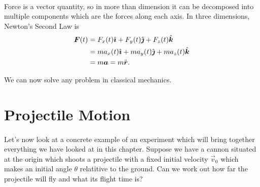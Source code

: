\documentclass[../classical_mechanics.tex]{subfiles}
\begin{document}
        \paragraph{}
        Force is a vector quantity, so in more than dimension it can be decomposed into multiple components which are the forces along each axis.
        In three dimensions, Newton's Second Law is
        \begin{align*}
            \boldsymbol{F}(t)&=F_x(t)\hat{\boldsymbol{\imath}}+F_y(t)\hat{\boldsymbol{\jmath}}+F_z(t)\hat{\boldsymbol{k}}\\
            &=ma_x(t)\hat{\boldsymbol{\imath}}+ma_y(t)\hat{\boldsymbol{\jmath}}+ma_z(t)\hat{\boldsymbol{k}} \\
            &=m\boldsymbol{a}=m\ddot{\boldsymbol{r}}.
        \end{align*}

        We can now solve any problem in classical mechanics.

    \section{Projectile Motion}
        \paragraph{}
        Let's now look at a concrete example of an experiment which will bring together everything we have looked at in this chapter.
        Suppose we have a cannon situated at the origin which shoots a projectile with a fixed initial velocity $\vec{v}_0$ which makes an initial angle $\theta$ relatitive to the ground.
        Can we work out how far the projectile will fly and what its flight time is?
\end{document}

